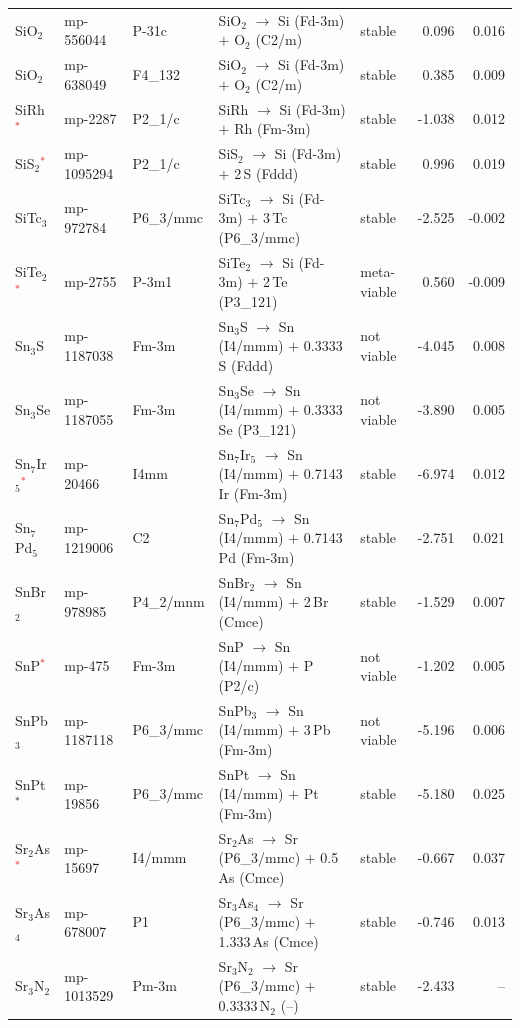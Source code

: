 \begin{longtable}{@{}ll l@{\hspace{4pt}} p{4.6cm} l@{\hspace{4pt}} rr@{}}
SiO$_{2}$ & mp-556044 & P-31c & SiO$_{2}$ $\to$ Si (Fd-3m) $+$ O$_{2}$ (C2/m) & stable & 0.096 & 0.016 \\
SiO$_{2}$ & mp-638049 & F4\_132 & SiO$_{2}$ $\to$ Si (Fd-3m) $+$ O$_{2}$ (C2/m) & stable & 0.385 & 0.009 \\
SiRh\textcolor{red}{$^*$} & mp-2287 & P2\_1/c & SiRh $\to$ Si (Fd-3m) $+$ Rh (Fm-3m) & stable & -1.038 & 0.012 \\
SiS$_{2}$\textcolor{red}{$^*$} & mp-1095294 & P2\_1/c & SiS$_{2}$ $\to$ Si (Fd-3m) $+$ 2\,S (Fddd) & stable & 0.996 & 0.019 \\
SiTc$_{3}$ & mp-972784 & P6\_3/mmc & SiTc$_{3}$ $\to$ Si (Fd-3m) $+$ 3\,Tc (P6\_3/mmc) & stable & -2.525 & -0.002 \\
SiTe$_{2}$\textcolor{red}{$^*$} & mp-2755 & P-3m1 & SiTe$_{2}$ $\to$ Si (Fd-3m) $+$ 2\,Te (P3\_121) & meta-viable & 0.560 & -0.009 \\
Sn$_{3}$S & mp-1187038 & Fm-3m & Sn$_{3}$S $\to$ Sn (I4/mmm) $+$ 0.3333\,S (Fddd) & not viable & -4.045 & 0.008 \\
Sn$_{3}$Se & mp-1187055 & Fm-3m & Sn$_{3}$Se $\to$ Sn (I4/mmm) $+$ 0.3333\,Se (P3\_121) & not viable & -3.890 & 0.005 \\
Sn$_{7}$Ir$_{5}$\textcolor{red}{$^*$} & mp-20466 & I4mm & Sn$_{7}$Ir$_{5}$ $\to$ Sn (I4/mmm) $+$ 0.7143\,Ir (Fm-3m) & stable & -6.974 & 0.012 \\
Sn$_{7}$Pd$_{5}$ & mp-1219006 & C2 & Sn$_{7}$Pd$_{5}$ $\to$ Sn (I4/mmm) $+$ 0.7143\,Pd (Fm-3m) & stable & -2.751 & 0.021 \\
SnBr$_{2}$ & mp-978985 & P4\_2/mnm & SnBr$_{2}$ $\to$ Sn (I4/mmm) $+$ 2\,Br (Cmce) & stable & -1.529 & 0.007 \\
SnP\textcolor{red}{$^*$} & mp-475 & Fm-3m & SnP $\to$ Sn (I4/mmm) $+$ P (P2/c) & not viable & -1.202 & 0.005 \\
SnPb$_{3}$ & mp-1187118 & P6\_3/mmc & SnPb$_{3}$ $\to$ Sn (I4/mmm) $+$ 3\,Pb (Fm-3m) & not viable & -5.196 & 0.006 \\
SnPt$^*$ & mp-19856 & P6\_3/mmc & SnPt $\to$ Sn (I4/mmm) $+$ Pt (Fm-3m) & stable & -5.180 & 0.025 \\
Sr$_{2}$As\textcolor{red}{$^*$} & mp-15697 & I4/mmm & Sr$_{2}$As $\to$ Sr (P6\_3/mmc) $+$ 0.5\,As (Cmce) & stable & -0.667 & 0.037 \\
Sr$_{3}$As$_{4}$ & mp-678007 & P1 & Sr$_{3}$As$_{4}$ $\to$ Sr (P6\_3/mmc) $+$ 1.333\,As (Cmce) & stable & -0.746 & 0.013 \\
Sr$_{3}$N$_{2}$ & mp-1013529 & Pm-3m & Sr$_{3}$N$_{2}$ $\to$ Sr (P6\_3/mmc) $+$ 0.3333\,N$_{2}$ (--) & stable & -2.433 & -- \\

\end{longtable}
